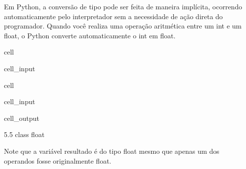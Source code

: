 \documentclass[letterpaper,10pt,english]{jupyterBook}
\begin{document}
\sphinxAtStartPar
Em Python, a conversão de tipo pode ser feita de maneira implícita, ocorrendo automaticamente pelo interpretador sem a necessidade de ação direta do programador. Quando você realiza uma operação aritmética entre um int e um float, o Python converte automaticamente o int em float.

\begin{sphinxuseclass}{cell}\begin{sphinxVerbatimInput}

\begin{sphinxuseclass}{cell_input}
\begin{sphinxVerbatim}[commandchars=\\\{\}]
  
  
    
\end{sphinxVerbatim}

\end{sphinxuseclass}\end{sphinxVerbatimInput}

\end{sphinxuseclass}
\begin{sphinxuseclass}{cell}\begin{sphinxVerbatimInput}

\begin{sphinxuseclass}{cell_input}
\begin{sphinxVerbatim}[commandchars=\\\{\}]
\end{sphinxVerbatim}

\end{sphinxuseclass}\end{sphinxVerbatimInput}
\begin{sphinxVerbatimOutput}

\begin{sphinxuseclass}{cell_output}
\begin{sphinxVerbatim}[commandchars=\\\{\}]
5.5
\PYGZlt{}class \PYGZsq{}float\PYGZsq{}\PYGZgt{}
\end{sphinxVerbatim}

\end{sphinxuseclass}\end{sphinxVerbatimOutput}

\end{sphinxuseclass}
\sphinxAtStartPar
Note que a variável resultado é do tipo float mesmo que apenas um dos operandos fosse originalmente float.
\end{document}
